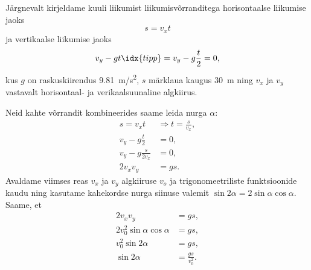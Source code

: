 \documentclass[11pt]{article}
\begin{document}
{{Järgnevalt kirjeldame kuuli liikumist liikumisvõrranditega horisontaalse liikumise jaoks
$$
s=v_{x}t
$$
ja vertikaalse liikumise jaoks
$$
v_{y}-gt\idx{tipp}=v_{y}-g\frac{t}{2}=0,
$$
kus $g$ on raskuskiirendus \SI{9,81}{m/s^2}, $s$ märklaua kaugus \SI{30}{m} ning $v_x$ ja $v_y$ vastavalt horisontaal- ja verikaalsuunaline algkiirus.

Neid kahte võrrandit kombineerides saame leida nurga $\alpha$:
\begin{align*}
s=v_{x}t & \Rightarrow t=\frac{s}{v_{x}},\\
v_{y}-g\frac{t}{2} & = 0,\\
v_{y}-g\frac{s}{2v_{x}} & = 0,\\
2v_{x}v_{y} & = gs.
\end{align*}
Avaldame viimses reas $v_x$ ja $v_y$ algkiiruse $v_o$ ja trigonomeetriliste funktsioonide kaudu ning kasutame kahekordse nurga siinuse valemit 
$\sin2\alpha = 2\sin\alpha\cos\alpha$. Saame, et 
\begin{align*}
2v_{x}v_{y} & = gs,\\
2v_{0}^{2}\sin\alpha\cos\alpha & = gs,\\
v_{0}^{2}\sin2\alpha & = gs,\\
\sin2\alpha & = \frac{gs}{v_{0}^{2}}.
\end{align*}

}}
\end{document}
